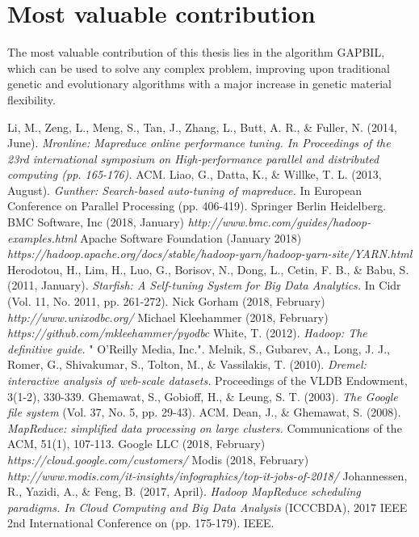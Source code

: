 \documentclass[a4paper,english]{report}
\begin{document}
		\section{Most valuable contribution}
		The most valuable contribution of this thesis lies in the algorithm GAPBIL, which can be used to solve any complex problem, improving upon traditional genetic and evolutionary algorithms with a major increase in genetic material flexibility.
	\begin{thebibliography}{1}
		Li, M., Zeng, L., Meng, S., Tan, J., Zhang, L., Butt, A. R., \& Fuller, N. (2014, June). \emph{Mronline: Mapreduce online performance tuning. In Proceedings of the 23rd international symposium on High-performance parallel and distributed computing (pp. 165-176).} ACM.
		Liao, G., Datta, K., \& Willke, T. L. (2013, August). \emph{Gunther: Search-based auto-tuning of mapreduce.} In European Conference on Parallel Processing (pp. 406-419). Springer Berlin Heidelberg.
		BMC Software, Inc (2018, January) \emph{http://www.bmc.com/guides/hadoop-examples.html}
		Apache Software Foundation (January 2018) \emph{https://hadoop.apache.org/docs/stable/hadoop-yarn/hadoop-yarn-site/YARN.html}
		Herodotou, H., Lim, H., Luo, G., Borisov, N., Dong, L., Cetin, F. B., \& Babu, S. (2011, January). \emph{Starfish: A Self-tuning System for Big Data Analytics.} In Cidr (Vol. 11, No. 2011, pp. 261-272).
		Nick Gorham (2018, February) \emph{http://www.unixodbc.org/}
		Michael Kleehammer (2018, February) \emph{https://github.com/mkleehammer/pyodbc}
		White, T. (2012). \emph{Hadoop: The definitive guide.} " O'Reilly Media, Inc.".
		Melnik, S., Gubarev, A., Long, J. J., Romer, G., Shivakumar, S., Tolton, M., \& Vassilakis, T. (2010). \emph{Dremel: interactive analysis of web-scale datasets.} Proceedings of the VLDB Endowment, 3(1-2), 330-339.
		Ghemawat, S., Gobioff, H., \& Leung, S. T. (2003). \emph{The Google file system} (Vol. 37, No. 5, pp. 29-43). ACM.
		Dean, J., \& Ghemawat, S. (2008). \emph{MapReduce: simplified data processing on large clusters.} Communications of the ACM, 51(1), 107-113.
		Google LLC (2018, February) \emph{https://cloud.google.com/customers/}
		Modis (2018, February) \emph{http://www.modis.com/it-insights/infographics/top-it-jobs-of-2018/}
		Johannessen, R., Yazidi, A., \& Feng, B. (2017, April). \emph{Hadoop MapReduce scheduling paradigms. In Cloud Computing and Big Data Analysis} (ICCCBDA), 2017 IEEE 2nd International Conference on (pp. 175-179). IEEE.

\end{thebibliography}
\end{document}
